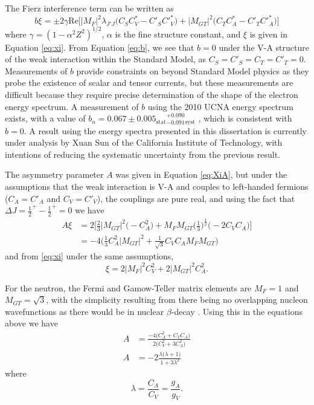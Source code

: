 The Fierz interference term can be written as
\begin{equation}
  b\xi = \pm 2\gamma \mathrm{Re}\bigg[|M_{F}|^2 \lambda_{J'J}\big(C_SC^*_V-C'_SC'^*_V \big) 
    + |M_{GT}|^2\big(C_TC^*_A-C'_TC'^*_A \big) \bigg]
  \label{eq:b}
\end{equation}
where $\gamma = (1-\alpha ^2 Z^2)^{1/2}$, $\alpha$ is the fine structure constant, and $\xi$ is given in
Equation \ref{eq:xi}. From Equation \ref{eq:b}, we see that $b=0$ under the V-A structure
of the weak interaction within the Standard Model, as
$C_S = C'_S = C_T = C'_T = 0$. Measurements of $b$ provide constraints on
beyond Standard Model physics as they probe the existence of scalar and tensor currents,
but these measurements are difficult because they
require precise determination of the shape of the electron energy spectrum. A measurement of
$b$ using the 2010 UCNA energy spectrum exists, with a value of
$b_n = 0.067 \pm 0.005_{\mathrm{stat}}{}^{+ 0.090}_{-0.091}{}_{\mathrm{syst}}$ \cite{hickerson2017}, which is consistent with
$b=0$. A result using the energy
spectra presented in this dissertation is currently under analysis by Xuan Sun of the California Institute of
Technology, with intentions of reducing the
systematic uncertainty from the previous result.

The asymmetry parameter $A$ was given in Equation \ref{eq:XiA}, but under the assumptions that the
weak interaction is V-A and couples to left-handed fermions ($C_A=C'_A$ and $C_V=C'_V$), the couplings
are pure real, and using the fact that
$\Delta J = {\frac{1}{2}}^+ - {\frac{1}{2}}^+ = 0$ we have
%
\begin{align}
  A\xi &= 2\bigg[ \frac{2}{3} |M_{GT}|^2 \Big(-C_A^2\Big) 
    + M_FM_{GT}\Big(\frac{1}{3}\Big)^{\frac{1}{2}}\big(-2C_VC_A \big) \bigg] \\
  &=-4 \bigg( \frac{1}{3}C_A^2|M_{GT}|^2 + \frac{1}{\sqrt{3}} C_VC_A M_FM_{GT} \bigg)
  \label{eq:XiAsimple}
\end{align}
%
and from \ref{eq:xi} under the same assumptions,
%
\begin{equation}
  \xi = 2|M_F|^2C_V^2+2|M_{GT}|^2C_A^2.
\end{equation}
%

For the neutron, the Fermi and Gamow-Teller matrix elements are $M_F=1$ and
$M_{GT} = \sqrt{3}$, with the simplicity resulting from there being no
overlapping nucleon wavefunctions as there would be in nuclear $\beta$-decay
\cite{grotz1990}. Using this in the equations above we have
%
\begin{align}
  A & =\frac{-4 \big( C_A^2 +  C_VC_A \big)}{2 \big(C_V^2 + 3C_A^2\big)} \\
  A & = -2 \frac{ \lambda \big(\lambda+1\big)}{ 1 + 3\lambda^2}
\end{align}
%
where
%
\begin{equation}
  \lambda = \frac{C_A}{C_V} = \frac{g_A}{g_V}.
\end{equation}

